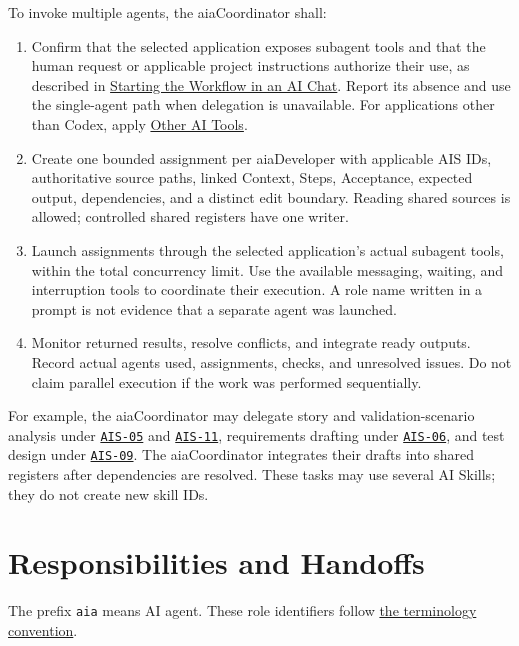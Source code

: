 To invoke multiple agents, the aiaCoordinator shall:
\begin{enumerate}
\item Confirm that the selected application exposes subagent tools and that the human request or
applicable project instructions authorize their use, as described in
\hyperref[Section:AIImplementationStart]{Starting the Workflow in an AI Chat}. Report its absence and use the
single-agent path when delegation is unavailable. For applications other than
Codex, apply \hyperref[Section:AIOtherTools]{Other AI Tools}.
\item Create one bounded assignment per aiaDeveloper with applicable AIS IDs,
authoritative source paths, linked Context, Steps, Acceptance, expected output, dependencies, and a distinct edit boundary. Reading
shared sources is allowed; controlled shared registers have one writer.
\item Launch assignments through the selected application's actual subagent tools, within the
total concurrency limit. Use the available messaging, waiting, and interruption
tools to coordinate their execution. A role name written in a
prompt is not evidence that a separate agent was launched.
\item Monitor returned results, resolve conflicts, and integrate ready outputs.
Record actual agents used, assignments, checks, and unresolved issues. Do not
claim parallel execution if the work was performed sequentially.
\end{enumerate}
For example, the aiaCoordinator may delegate story and validation-scenario
analysis under \hyperref[Skill:AIS-05]{\texttt{AIS-05}} and \hyperref[Skill:AIS-11]{\texttt{AIS-11}}, requirements drafting
under \hyperref[Skill:AIS-06]{\texttt{AIS-06}}, and test design under \hyperref[Skill:AIS-09]{\texttt{AIS-09}}. The aiaCoordinator
integrates their drafts into shared registers after dependencies are resolved.
These tasks may use several AI Skills; they do not create new skill IDs.

\section{Responsibilities and Handoffs}
\label{Section:AIAgentRoles}
The prefix \texttt{aia} means AI agent. These role identifiers follow
\hyperref[Rule:AITerminologyConsistency]{the terminology convention}.

